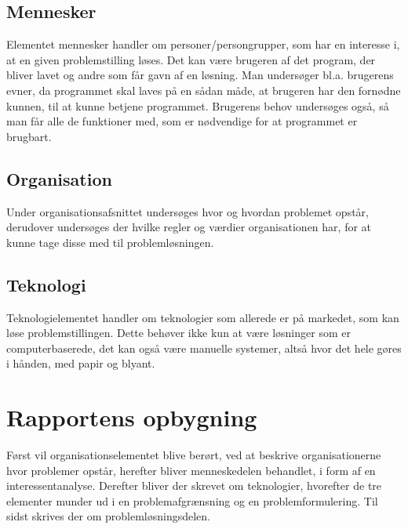 \subsection{Mennesker}\label{subsec:mennesker}

Elementet mennesker handler om personer/persongrupper, som har en interesse i, at en given problemstilling
løses. Det kan være brugeren af det program, der bliver lavet og andre som får gavn af en løsning. Man
undersøger bl.a. brugerens evner, da programmet skal laves på en sådan måde, at brugeren har den
fornødne kunnen, til at kunne betjene programmet. Brugerens behov undersøges også, så man får alle de funktioner
med, som er nødvendige for at programmet er brugbart.


\subsection{Organisation}\label{subsec:organisation}

Under organisationsafsnittet undersøges hvor og hvordan problemet opstår, derudover undersøges der hvilke regler
og værdier organisationen har, for at kunne tage disse med til problemløsningen.


\subsection{Teknologi}\label{subsec:Teknologi}

Teknologielementet handler om teknologier som allerede er på markedet, som kan løse problemstillingen. Dette
behøver ikke kun at være løsninger som er computerbaserede, det kan også være manuelle systemer, altså hvor
det hele gøres i hånden, med papir og blyant.


\section{Rapportens opbygning}\label{sec:rapportens-opbygning}

Først vil organisationselementet blive berørt, ved at beskrive organisationerne hvor problemer opstår, herefter bliver
menneskedelen behandlet, i form af en interessentanalyse. Derefter bliver der skrevet om teknologier,
hvorefter de tre elementer munder ud i en problemafgrænsning og en problemformulering. Til sidst skrives der
om problemløsningsdelen. 
